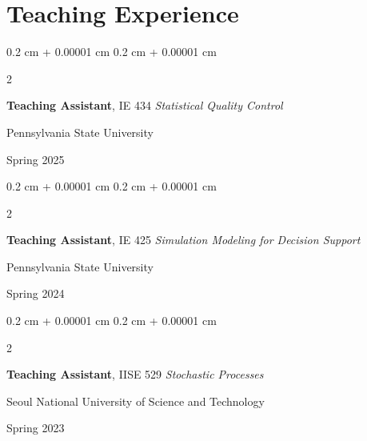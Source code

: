 \documentclass[10pt, letterpaper]{article}
\newenvironment{onecolentry}{
    \begin{adjustwidth}{
        0.2 cm + 0.00001 cm
    }{
        0.2 cm + 0.00001 cm
    }
}{
    \end{adjustwidth}
} %
\newenvironment{twocolentry}[2][]{
    \onecolentry
    \def\secondColumn{#2}
    \setcolumnwidth{\fill, 3.4 cm}
    \begin{paracol}{2}
}{
    \switchcolumn \raggedleft \secondColumn
    \end{paracol}
    \endonecolentry
} %
\begin{document}

\section{Teaching Experience}
    \begin{twocolentry}{Spring 2025}
        \textbf{Teaching Assistant}, IE 434 \textit{Statistical Quality Control}
        
        Pennsylvania State University
    \end{twocolentry}
    
    \begin{twocolentry}{Spring 2024}
        \textbf{Teaching Assistant}, IE 425 \textit{Simulation Modeling for Decision Support}
        
        Pennsylvania State University
    \end{twocolentry}
    
    \begin{twocolentry}{Spring 2023}
        \textbf{Teaching Assistant}, IISE 529 \textit{Stochastic Processes}
        
        Seoul National University of Science and Technology
    \end{twocolentry}
    


\end{document}
